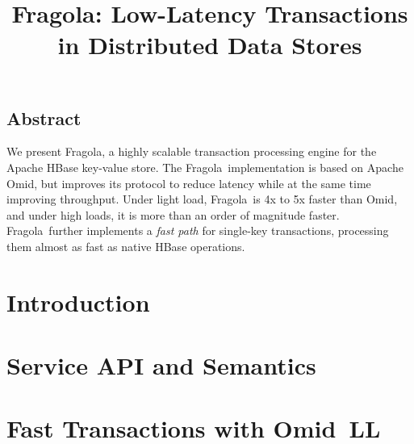 \documentclass[letterpaper,twocolumn,10pt]{article}
\newcommand{\remove}[1]{}
\newcommand{\tb}{\hspace{5mm}}
\newcommand{\sys}{Fragola}
\newcommand{\sysll}{Omid~LL}
\begin{document}
\date{}

\title{\Large \bf \sys: Low-Latency Transactions in Distributed Data Stores}


\author{
\remove{
{\rm Yonatan Gottesman\footnotemark[1]\tb Aran Bergman\footnotemark[2]\tb   Edward Bortnikov\footnotemark[1] }\\ 
{\rm Eshcar Hillel\footnotemark[1]\tb Idit Keidar\footnotemark[1] \footnotemark[2]\tb Ohad Shacham\footnotemark[1]}\\
	\footnotemark[1] Yahoo Research\ \ \footnotemark[2] Technion  \\ [2mm]
\small Submission Type: Research	
}
} %


\maketitle




\subsection*{Abstract}

We present \sys, a highly scalable transaction processing engine 
for the Apache HBase key-value store. The \sys\ implementation is based 
on Apache Omid, but improves its protocol to reduce latency 
while at the same time improving throughput.
Under light load, \sys\ is 4x to 5x faster than Omid, and under high loads, it is 
more than an order of magnitude faster. 
 \sys\ further implements a \emph{fast path} for single-key transactions,
processing them almost as fast as native HBase operations.




\section{Introduction} \label{sec:intro}
 

\section{Service API and Semantics} \label{sec:api}


\section{Fast Transactions with \sysll} \label{sec:ll}


\end{document}
